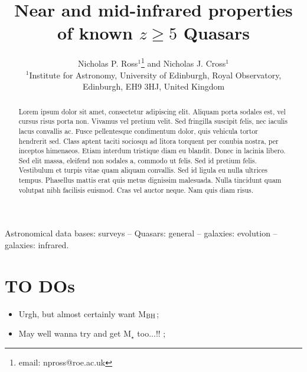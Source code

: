 \documentclass[usenatbib]{mnras}
\begin{document}
\title[Very high-$z$ Quasars]
        {Near and mid-infrared properties of known $z\geq5$ Quasars}
\author[N.P. Ross et al.]
       {Nicholas P. Ross$^{1}$\thanks{email: npross@roe.ac.uk} and Nicholas J. Cross$^{1}$
\\ 
$^1$Institute for Astronomy, University of Edinburgh, Royal Observatory, Edinburgh, EH9 3HJ, United Kingdom\\
}

\maketitle
\begin{abstract}
Lorem ipsum dolor sit amet, consectetur adipiscing elit. Aliquam porta
sodales est, vel cursus risus porta non. Vivamus vel pretium
velit. Sed fringilla suscipit felis, nec iaculis lacus convallis
ac. Fusce pellentesque condimentum dolor, quis vehicula tortor
hendrerit sed. Class aptent taciti sociosqu ad litora torquent per
conubia nostra, per inceptos himenaeos. Etiam interdum tristique diam
eu blandit. Donec in lacinia libero.
Sed elit massa, eleifend non sodales a, commodo ut felis. Sed id
pretium felis. Vestibulum et turpis vitae quam aliquam convallis. Sed
id ligula eu nulla ultrices tempus. Phasellus mattis erat quis metus
dignissim malesuada. Nulla tincidunt quam volutpat nibh facilisis
euismod. Cras vel auctor neque. Nam quis diam risus.
\end{abstract}


\begin{keywords}
Astronomical data bases: surveys -- 
Quasars: general -- 
galaxies: evolution -- 
galaxies: infrared.
\end{keywords}



\section*{TO DOs}
\begin{itemize}
\item Urgh, but almost certainly want M$_{\rm BH}$; 
\item May well wanna try and get M$_{\star}$ too...!! ; 
\end{itemize}



\end{document}
